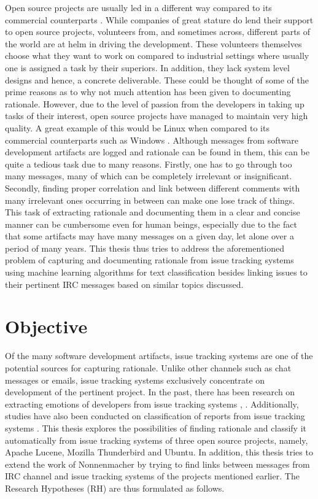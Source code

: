 \documentclass[a4paper,12pt,twoside]{report}
\begin{document}
\newline \newline
Open source projects are usually led in a different way compared to its commercial counterparts \cite{mockus2002two}. While companies of great stature do lend their support to open source projects, volunteers from, and sometimes across, different parts of the world are at helm in driving the development. These volunteers themselves choose what they want to work on compared to industrial settings where usually one is assigned a task by their superiors. In addition, they lack system level designs and hence, a concrete deliverable. These could be thought of some of the prime reasons as to why not much attention has been given to documenting rationale. However, due to the level of passion from the developers in taking up tasks of their interest, open source projects have managed to maintain very high quality. A great example of this would be Linux when compared to its commercial counterparts such as Windows \cite{mockus2002two}. 
\newline \newline
Although messages from software development artifacts are logged and rationale can be found in them, this can be quite a tedious task due to many reasons. Firstly, one has to go through too many messages, many of which can be completely irrelevant or insignificant. Secondly, finding proper correlation and link between different comments with many irrelevant ones occurring in between can make one lose track of things. This task of extracting rationale and documenting them in a clear and concise manner can be cumbersome even for human beings, especially due to the fact that some artifacts may have many messages on a given day, let alone over a period of many years. This thesis thus tries to address the aforementioned problem of capturing and documenting rationale from issue tracking systems using machine learning algorithms for text classification besides linking issues to their pertinent \acs{IRC} messages based on similar topics discussed.

\section{Objective}
Of the many software development artifacts, issue tracking systems are one of the potential sources for capturing rationale. Unlike other channels such as chat messages or emails, issue tracking systems exclusively concentrate on development of the pertinent project. In the past, there has been research on extracting emotions of developers from issue tracking systems \cite{Marshall2016}, \cite{Robillard2017}. Additionally, studies have also been conducted on classification of reports from issue tracking systems \cite{Fan2017}. This thesis explores the possibilities of finding rationale and classify it automatically from issue tracking systems of three open source projects, namely, Apache Lucene, Mozilla Thunderbird and Ubuntu. In addition, this thesis tries to extend the work of Nonnenmacher \cite{Nonnenmacher2017} by trying to find links between messages from \acs{IRC} channel and issue tracking systems of the projects mentioned earlier. The Research Hypotheses (RH) are thus formulated as follows.
\end{document}
